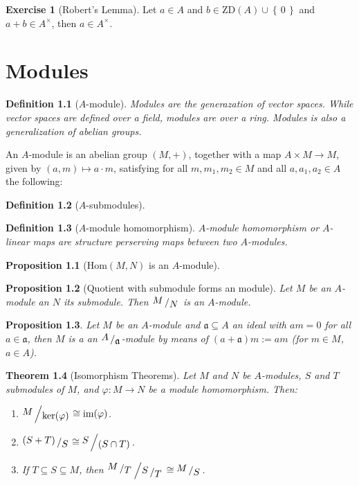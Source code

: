 \documentclass{book}
\theoremstyle{plain}
\newtheorem{thm}{Theorem}[chapter] %
\newtheorem{prps}{Proposition}
\theoremstyle{definition}
\newtheorem{exr}[thm]{Exercise}
\theoremstyle{custom_definition}
\newtheorem{defn}[thm]{Definition}
\newcommand{\set}[1]{\left\{\, #1 \,\right\}}
\newcommand{\bigslant}[2]{{\raisebox{.2em}{$#1$}\left/\raisebox{-.2em}{$#2$}\right.}}
\begin{document}
\begin{exr}[Robert's Lemma]
    Let \(a \in A\) and \(b \in \text{ZD}(A) \cup \set{0}\) and \(a + b \in A^\times\), then \(a \in A^\times\).
\end{exr}

\chapter{Modules}

\begin{defn}[\(A\)-module]
    \textit{Modules are the generazation of vector spaces. While vector spaces are defined over a field, modules are over a ring. Modules is also a generalization of abelian groups.}

    An \(A\)-module is an abelian group \((M, +)\), together with a map \(A \times M \longrightarrow M\), given by \((a, m) \mapsto a \cdot m\), satisfying for all \(m, m_1, m_2 \in M\) and all \(a, a_1, a_2 \in A\) the following:
\end{defn}

\begin{defn}[\(A\)-submodules]
\end{defn}

\begin{defn}[\(A\)-module homomorphism]
    \textit{\(A\)-module homomorphism or \(A\)-linear maps are structure perserving maps between two \(A\)-modules.}
\end{defn}

\begin{prps}[\(\text{Hom}(M, N)\) is an \(A\)-module]
\end{prps}

\begin{prps}[Quotient with submodule forms an module]
    Let \(M\) be an \(A\)-module an \(N\) its submodule. Then \(\bigslant{M}{N}\) is an \(A\)-module.
\end{prps}

\begin{prps}
    Let \(M\) be an \(A\)-module and \(\mathfrak{a} \subseteq A\) an ideal with \(am = 0\) for all \(a \in \mathfrak{a}\), then \(M\) is a an \(\bigslant{A}{\mathfrak{a}}\)-module by means of \((a + \mathfrak{a})m := am\) (for \(m \in M\), \(a \in A\)).
\end{prps}

\begin{thm}[Isomorphism Theorems]
    Let \(M\) and \(N\) be \(A\)-modules, \(S\) and \(T\) submodules of \(M\), and \(\varphi: M \longrightarrow N\) be a module homomorphism. Then:
    \begin{enumerate}
        \item \(\bigslant{M}{\text{ker}(\varphi)} \cong \text{im}(\varphi)\).
        \item \(\bigslant{(S + T)}{S} \cong \bigslant{S}{(S \cap T)}\).
        \item If \(T \subseteq S \subseteq M\), then \(\bigslant{\bigslant{M}{T}}{\bigslant{S}{T}} \cong \bigslant{M}{S}\).
    \end{enumerate}
\end{thm}
\end{document}
